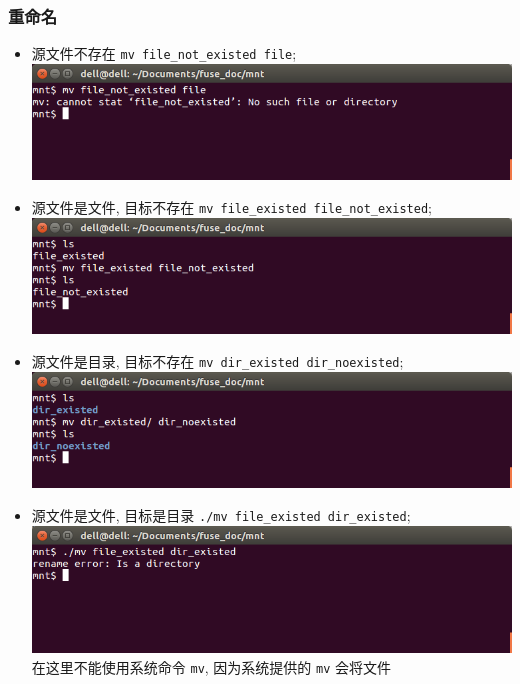 \documentclass[nofonts, titlepage]{ctexart}
\begin{document}
\subsubsection{重命名}
\begin{itemize}
\item
  源文件不存在 \texttt{mv file\_not\_existed file};\\
  \includegraphics[width=14cm]{./images/./mv_t1.png}
\item
  源文件是文件, 目标不存在
  \texttt{mv file\_existed file\_not\_existed};\\
  \includegraphics[width=14cm]{./images/./mv_t2.png}
\item
  源文件是目录, 目标不存在 \texttt{mv dir\_existed dir\_noexisted};\\
  \includegraphics[width=14cm]{./images/./mv_t3.png}
\item
  源文件是文件, 目标是目录 \texttt{./mv file\_existed dir\_existed};\\
  \includegraphics[width=14cm]{./images/./mv_t4.png} \\
  在这里不能使用系统命令 \verb'mv', 因为系统提供的 \verb'mv' 会将文件

\end{itemize}
\end{document}

